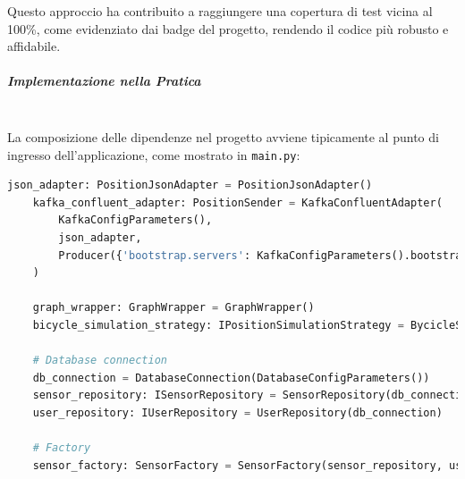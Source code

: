 \documentclass[10pt]{article}
\newcommand{\mysubparagraph}[1]{\subparagraph{#1}\mbox{}\\}
\begin{document}
    Questo approccio ha contribuito a raggiungere una copertura di test vicina al 100\%, come evidenziato dai badge del progetto, rendendo il codice più robusto e affidabile.
    
    \mysubparagraph{Implementazione nella Pratica}
    
    La composizione delle dipendenze nel progetto avviene tipicamente al punto di ingresso dell'applicazione, come mostrato in \texttt{main.py}:
    
    \begin{lstlisting}[language=Python, caption=Composizione delle dipendenze in main.py]
    json_adapter: PositionJsonAdapter = PositionJsonAdapter()
    kafka_confluent_adapter: PositionSender = KafkaConfluentAdapter(
        KafkaConfigParameters(),
        json_adapter,
        Producer({'bootstrap.servers': KafkaConfigParameters().bootstrap_servers})
    )
    
    graph_wrapper: GraphWrapper = GraphWrapper()
    bicycle_simulation_strategy: IPositionSimulationStrategy = BycicleSimulationStrategy(graph_wrapper)
    
    # Database connection
    db_connection = DatabaseConnection(DatabaseConfigParameters())
    sensor_repository: ISensorRepository = SensorRepository(db_connection)
    user_repository: IUserRepository = UserRepository(db_connection)
    
    # Factory
    sensor_factory: SensorFactory = SensorFactory(sensor_repository, user_repository)
    \end{lstlisting}



\end{document}
